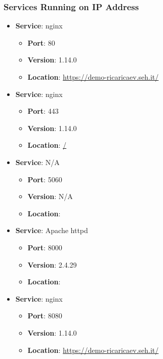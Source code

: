 \documentclass{article}
\begin{document}
\subsubsection*{Services Running on IP Address}

\begin{itemize}
    
        \item \textbf{Service}: nginx
        \begin{itemize}
            \item \textbf{Port}: 80
            \item \textbf{Version}:  1.14.0 
            \item \textbf{Location}: \href{ https://demo-ricaricaev.seh.it/ }{ https://demo-ricaricaev.seh.it/ }
        \end{itemize}
    
        \item \textbf{Service}: nginx
        \begin{itemize}
            \item \textbf{Port}: 443
            \item \textbf{Version}:  1.14.0 
            \item \textbf{Location}: \href{ / }{ / }
        \end{itemize}
    
        \item \textbf{Service}: N/A
        \begin{itemize}
            \item \textbf{Port}: 5060
            \item \textbf{Version}:  N/A 
            \item \textbf{Location}: \href{  }{  }
        \end{itemize}
    
        \item \textbf{Service}: Apache httpd
        \begin{itemize}
            \item \textbf{Port}: 8000
            \item \textbf{Version}:  2.4.29 
            \item \textbf{Location}: \href{  }{  }
        \end{itemize}
    
        \item \textbf{Service}: nginx
        \begin{itemize}
            \item \textbf{Port}: 8080
            \item \textbf{Version}:  1.14.0 
            \item \textbf{Location}: \href{ https://demo-ricaricaev.seh.it/ }{ https://demo-ricaricaev.seh.it/ }
        \end{itemize}
    

\end{itemize}
\end{document}
